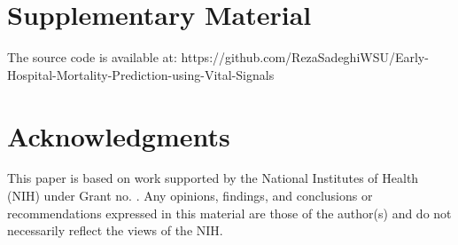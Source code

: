 \documentclass[3p]{elsarticle}
\begin{document}
\section*{Supplementary Material}
  \label{sec:supplementary}

 The source code is available at: https://github.com/RezaSadeghiWSU/Early-Hospital-Mortality-Prediction-using-Vital-Signals

\section*{Acknowledgments}
  \label{sec:Acknowledgments}
This paper is based on work supported by the National Institutes of Health (NIH) under Grant no. . Any opinions, findings, and conclusions or recommendations expressed in this material are those of the author(s) and do not necessarily reflect the views of the NIH. 








\end{document}
